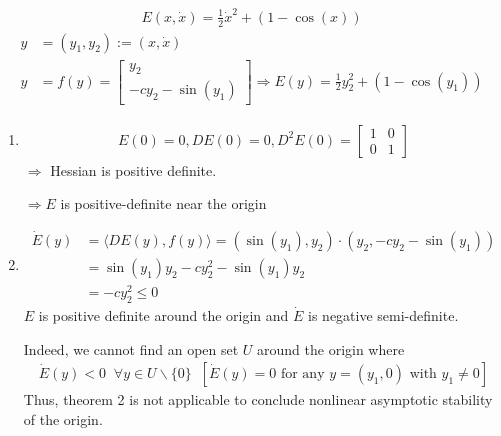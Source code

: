 \begin{solution}[3.4]
	\leavevmode
\begin{align}
	E(x,\dot{x}) = \frac{1}{2}\dot{x}^2 + (1 - \cos(x))
\end{align}
\begin{align}
	y &= (y_1,y_2) := (x, \dot{x}) \\
	y &= f(y) = \begin{bmatrix}
		y_2 \\
		-cy_2 - \sin(y_1)
	\end{bmatrix} \Longrightarrow
	E(y) = \frac{1}{2}y_2^2 + (1 - \cos(y_1))
\end{align}

\begin{enumerate}
\item 
\begin{align}
	E(0) = 0, DE(0) = 0, D^2E(0) = \begin{bmatrix}
	1 & 0 \\ 0 & 1
	\end{bmatrix}
\end{align}
$\Longrightarrow$ Hessian is positive definite.

$\Longrightarrow E$ is positive-definite near the origin

\item 
\begin{align}
	\dot{E}(y) &= \langle DE(y),f(y) \rangle = (\sin(y_1),y_2) \cdot (y_2, -cy_2 - \sin(y_1)) \\
	&= \sin(y_1)y_2 - cy_2^2 -\sin(y_1)y_2 \\
	&= -cy_2^2 \leq 0
\end{align}
$E$ is positive definite around the origin and $\dot{E}$ is negative semi-definite.

Indeed, we cannot find an open set $U$ around the origin where
\begin{align}
	\dot{E}(y)<0 \;\; \forall y \in U\backslash \{0\} \;\; [\dot{E}(y)=0 \text{ for any } y = (y_1,0) \text{ with } y_1 \neq 0]
\end{align}
Thus, theorem 2 is not applicable to conclude nonlinear asymptotic stability of the origin.
\end{enumerate}
\end{solution}


